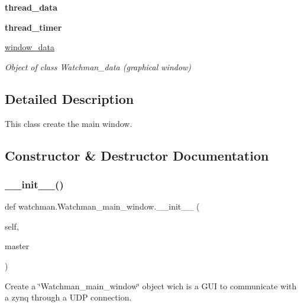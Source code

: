 \begin{DoxyCompactItemize}
{\bfseries thread\+\_\+data}
\item 
\mbox{\label{classwatchman_1_1_watchman__main__window_ad540b9d5fc5959783f5ee5031dc2514e}} 
{\bfseries thread\+\_\+timer}
\item 
\mbox{\label{classwatchman_1_1_watchman__main__window_aa6a1ea8eeed86393fa27029714047fdd}} 
\mbox{\hyperlink{classwatchman_1_1_watchman__main__window_aa6a1ea8eeed86393fa27029714047fdd}{window\+\_\+data}}
\begin{DoxyCompactList}\small\item\em Object of class Watchman\+\_\+data (graphical window) \end{DoxyCompactList}\end{DoxyCompactItemize}


\subsection{Detailed Description}
This class create the main window. 

\subsection{Constructor \& Destructor Documentation}
\mbox{\label{classwatchman_1_1_watchman__main__window_a4f1913d70284dd2b3d17e17a76d64bd8}} 
\subsubsection{\texorpdfstring{\_\_init\_\_()}{\_\_init\_\_()}}
{\footnotesize\ttfamily def watchman.\+Watchman\+\_\+main\+\_\+window.\+\_\+\+\_\+init\+\_\+\+\_\+ (\begin{DoxyParamCaption}\item[{}]{self,  }\item[{}]{master }\end{DoxyParamCaption})}



Create a \char`\"{}\+Watchman\+\_\+main\+\_\+window\char`\"{} object wich is a G\+UI to communicate with a zynq through a U\+DP connection. 


